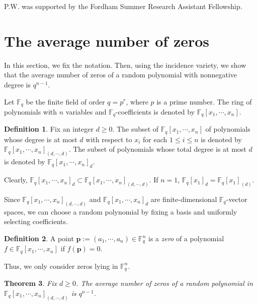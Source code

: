 \documentclass[12pt]{amsart}
\newtheorem{theorem}{Theorem}[section]
\theoremstyle{definition}
\newtheorem{definition}[theorem]{Definition}
\newcommand{\FF}{\mathbb{F} }
\newcommand{\bp}{\mathbf{p} }
\begin{document}
\acknowledgement

P.W. was supported by the Fordham Summer Research Assistant Fellowship. 



\section{The average number of zeros}\label{sec:average}

In this section, we fix the notation. Then, using the incidence variety, we show that the average number of zeros of a random polynomial with nonnegative degree is $q^{n-1}$. 

Let $\FF_q$ be the finite field of order $q = p^r$, where $p$ is a prime number. The ring of polynomials with $n$ variables and $\FF_q$-coefficients is denoted by $\FF_q[x_1, \cdots, x_n]$. 

\begin{definition}\label{def:multidegree} 
Fix an integer $d \ge 0$. The subset of $\FF_q[x_1, \cdots, x_n]$ of polynomials whose degree is at most $d$ with respect to $x_i$ for each $1 \le i \le n$ is denoted by $\FF_q[x_1, \cdots, x_n]_{(d,\cdots, d)}$. The subset of polynomials whose total degree is at most $d$ is denoted by $\FF_q[x_1, \cdots, x_n]_d$.
\end{definition}

Clearly, $\FF_q[x_1, \cdots, x_n]_d \subset \FF_q[x_1, \cdots, x_n]_{(d,\cdots, d)}$. If $n = 1$, $\FF_q[x_1]_d = \FF_q[x_1]_{(d)}$. 

Since $\FF_q[x_1, \cdots, x_n]_{(d, \cdots, d)}$ and $\FF_q[x_1, \cdots, x_n]_d$ are finite-dimensional $\FF_q$-vector spaces, we can choose a random polynomial by fixing a basis and uniformly selecting coefficients. 

\begin{definition}\label{def:zero}
A point $\bp := (a_1, \cdots, a_n) \in \FF_q^n$ is a \emph{zero} of a polynomial $f \in \FF_q[x_1, \cdots, x_n]$ if $f(\bp) = 0$.
\end{definition}

Thus, we only consider zeros lying in $\FF_q^n$.

\begin{theorem}\label{thm:affinemean}
Fix $d \ge 0$. The average number of zeros of a random polynomial in $\FF_q[x_1, \cdots, x_n]_{(d,\cdots, d)}$ is $q^{n-1}$.
\end{theorem}
\end{document}

